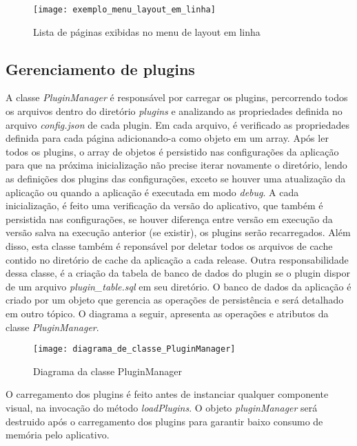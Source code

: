 \begin{figure}[H]
	\texttt{[image: exemplo\_menu\_layout\_em\_linha]}
	\centering
	\caption{Lista de páginas exibidas no menu de layout em linha}
\end{figure}


\subsection{Gerenciamento de plugins}\label{sec:solucao-desenvolvida}
A classe \textit{PluginManager} é responsável por carregar os plugins, percorrendo todos os arquivos dentro do diretório \textit{plugins} e analizando as propriedades definida no arquivo \textit{config.json} de cada plugin. Em cada arquivo, é verificado as propriedades definida para cada página adicionando-a como objeto em um array. Após ler todos os plugins, o array de objetos é persistido nas configurações da aplicação para que na próxima inicialização não precise iterar novamente o diretório, lendo as definições dos plugins das configurações, exceto se houver uma atualização da aplicação ou quando a aplicação é executada em modo \textit{debug}. A cada inicialização, é feito uma verificação da versão do aplicativo, que também é persistida nas configurações, se houver diferença entre versão em execução da versão salva na execução anterior (se existir), os plugins serão recarregados. Além disso, esta classe também é reponsável por deletar todos os arquivos de cache contido no diretório de cache da aplicação a cada release. Outra responsabilidade dessa classe, é a criação da tabela de banco de dados do plugin se o plugin dispor de um arquivo \textit{plugin\_table.sql} em seu diretório. O banco de dados da aplicação é criado por um objeto que gerencia as operações de persistência e será detalhado em outro tópico. O diagrama a seguir, apresenta as operações e atributos da classe \textit{PluginManager}.

\begin{figure}[H]
	\texttt{[image: diagrama\_de\_classe\_PluginManager]}
	\centering
	\caption{Diagrama da classe PluginManager}
\end{figure}

O carregamento dos plugins é feito antes de instanciar qualquer componente visual, na invocação do método \textit{loadPlugins}. O objeto \textit{pluginManager} será destruido após o carregamento dos plugins para garantir baixo consumo de memória pelo aplicativo.


